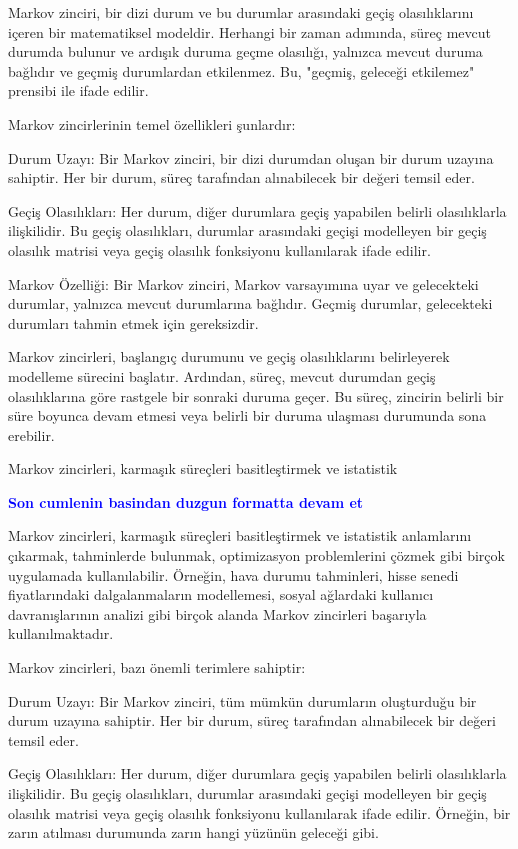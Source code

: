 \documentclass[11pt]{article}
\begin{document}
Markov zinciri, bir dizi durum ve bu durumlar arasındaki geçiş olasılıklarını içeren bir matematiksel modeldir. Herhangi bir zaman adımında, süreç mevcut durumda bulunur ve ardışık duruma geçme olasılığı, yalnızca mevcut duruma bağlıdır ve geçmiş durumlardan etkilenmez. Bu, "geçmiş, geleceği etkilemez" prensibi ile ifade edilir.

Markov zincirlerinin temel özellikleri şunlardır:

Durum Uzayı: Bir Markov zinciri, bir dizi durumdan oluşan bir durum uzayına sahiptir. Her bir durum, süreç tarafından alınabilecek bir değeri temsil eder.

Geçiş Olasılıkları: Her durum, diğer durumlara geçiş yapabilen belirli olasılıklarla ilişkilidir. Bu geçiş olasılıkları, durumlar arasındaki geçişi modelleyen bir geçiş olasılık matrisi veya geçiş olasılık fonksiyonu kullanılarak ifade edilir.

Markov Özelliği: Bir Markov zinciri, Markov varsayımına uyar ve gelecekteki durumlar, yalnızca mevcut durumlarına bağlıdır. Geçmiş durumlar, gelecekteki durumları tahmin etmek için gereksizdir.

Markov zincirleri, başlangıç durumunu ve geçiş olasılıklarını belirleyerek modelleme sürecini başlatır. Ardından, süreç, mevcut durumdan geçiş olasılıklarına göre rastgele bir sonraki duruma geçer. Bu süreç, zincirin belirli bir süre boyunca devam etmesi veya belirli bir duruma ulaşması durumunda sona erebilir.

Markov zincirleri, karmaşık süreçleri basitleştirmek ve istatistik

\textbf{\textcolor{blue}{Son cumlenin basindan duzgun formatta devam et}}

Markov zincirleri, karmaşık süreçleri basitleştirmek ve istatistik anlamlarını çıkarmak, tahminlerde bulunmak, optimizasyon problemlerini çözmek gibi birçok uygulamada kullanılabilir. Örneğin, hava durumu tahminleri, hisse senedi fiyatlarındaki dalgalanmaların modellemesi, sosyal ağlardaki kullanıcı davranışlarının analizi gibi birçok alanda Markov zincirleri başarıyla kullanılmaktadır.

Markov zincirleri, bazı önemli terimlere sahiptir:

Durum Uzayı: Bir Markov zinciri, tüm mümkün durumların oluşturduğu bir durum uzayına sahiptir. Her bir durum, süreç tarafından alınabilecek bir değeri temsil eder.

Geçiş Olasılıkları: Her durum, diğer durumlara geçiş yapabilen belirli olasılıklarla ilişkilidir. Bu geçiş olasılıkları, durumlar arasındaki geçişi modelleyen bir geçiş olasılık matrisi veya geçiş olasılık fonksiyonu kullanılarak ifade edilir. Örneğin, bir zarın atılması durumunda zarın hangi yüzünün geleceği gibi.
\end{document}
